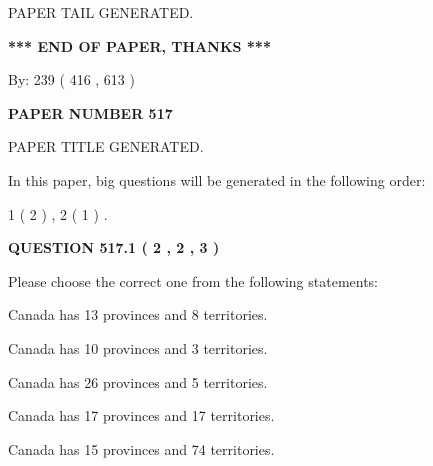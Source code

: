 \documentclass[12pt]{article}
\begin{document}
   
   
\vspace{2.0in} PAPER TAIL GENERATED.
   
   
   
   
\vspace{1.0in} 
{\textbf{\large{ *** END OF PAPER, THANKS *** }}} 
   
   
\hspace{1.0in} By: 
 239 ( 416 ,  613 )
   
   
   
   
\newpage 
\setcounter{page}{ 
   517001 } 
   
   
   
   
 {\textbf{ \Large{ PAPER NUMBER  517  }}}
   
   
\vspace{0.2in}
   
   
   
   
   
   
   
   
 \vspace{0.2in}
 
 
 
 
   
   
 PAPER TITLE GENERATED.
   
   
   
\vspace{0.2in}
   
In this paper, big questions will be generated in the following order: 
   
   
   1 ( 2 )
 ,
   2 ( 1 )
 .
  
\vspace{0.2in}
  
{\textbf{\Large{QUESTION
517.1 
 ( 2 , 2 , 3 )
}}}
  
  
Please choose the correct one from the following statements:
 
 
Canada has  13 provinces and  8 territories.
 
 
Canada has 10  provinces and 3 territories.
 
 
Canada has  26 provinces and  5 territories.
 
 
Canada has  17 provinces and  17 territories.
 
 
Canada has  15 provinces and  74 territories.
 
\end{document}
